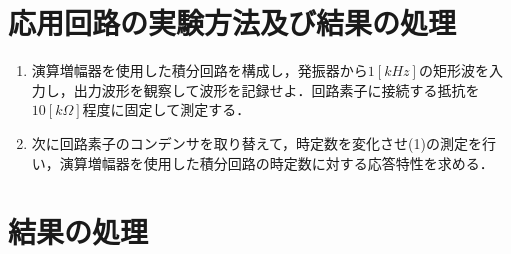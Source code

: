 \documentclass[10pt, a4j, dvipdfmx]{jarticle}
\begin{document}
\newpage
\section{応用回路の実験方法及び結果の処理}
\begin{enumerate}
    \item 演算増幅器を使用した積分回路を構成し，発振器から$1[kHz]$の矩形波を入力し，出力波形を観察して波形を記録せよ．回路素子に接続する抵抗を$10[k\Omega]$程度に固定して測定する．
    \item 次に回路素子のコンデンサを取り替えて，時定数を変化させ(1)の測定を行い，演算増幅器を使用した積分回路の時定数に対する応答特性を求める．
\end{enumerate}


\newpage
\section{結果の処理}
\end{document}
